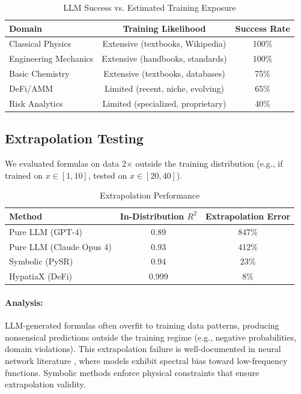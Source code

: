 \documentclass[twoside,11pt]{article}
\begin{document}
\begin{table}[htbp]
\centering
\caption{LLM Success vs. Estimated Training Exposure}
\label{tab:training_exposure}
\begin{tabular}{@{}lcc@{}}
\toprule
\textbf{Domain} & \textbf{Training Likelihood} & \textbf{Success Rate} \\
\midrule
Classical Physics & Extensive (textbooks, Wikipedia) & 100\% \\
Engineering Mechanics & Extensive (handbooks, standards) & 100\% \\
Basic Chemistry & Extensive (textbooks, databases) & 75\% \\
DeFi/AMM & Limited (recent, niche, evolving) & 65\% \\
Risk Analytics & Limited (specialized, proprietary) & 40\% \\
\bottomrule
\end{tabular}
\end{table}

\subsection{Extrapolation Testing}

We evaluated formulas on data 2$\times$ outside the training distribution (e.g., if trained on $x \in [1, 10]$, tested on $x \in [20, 40]$).

\begin{table}[htbp]
\centering
\caption{Extrapolation Performance}
\label{tab:extrapolation}
\begin{tabular}{@{}lcc@{}}
\toprule
\textbf{Method} & \textbf{In-Distribution $R^2$} & \textbf{Extrapolation Error} \\
\midrule
Pure LLM (GPT-4) & 0\citep{bubeck2023sparks}\citep{romera2023mathematical}\citep{kambhampati2024llms}.89 & 847\% \\
Pure LLM (Claude Opus 4) & 0\citep{kambhampati2024llms}.93 & 412\% \\
\midrule
Symbolic (PySR) & 0.94 & 23\% \\
HypatiaX (DeFi) & 0.999 & 8\% \\
\bottomrule
\end{tabular}
\end{table}

\paragraph{Analysis:} LLM-generated formulas often overfit to training data patterns, producing nonsensical predictions outside the training regime (e.g., negative probabilities, domain violations). This extrapolation failure is well-documented in neural network literature \citep{zhang2024extrapolation}, where models exhibit spectral bias toward low-frequency functions. Symbolic methods enforce physical constraints that ensure extrapolation validity.
\end{document}
